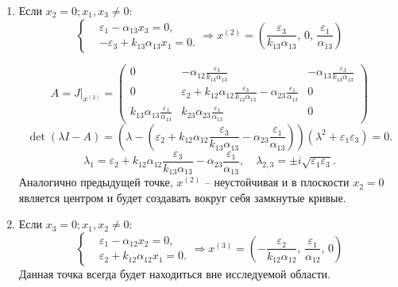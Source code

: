 \begin{enumerate}
        \item Если \( x_2 = 0; x_1, x_3 \neq 0 \):
            \[
                \left\{\begin{split}
                    & \varepsilon_1 - \alpha_{13} x_3 = 0, \\
                    & -\varepsilon_3 + k_{13} \alpha_{13} x_1 = 0. 
                \end{split}\right.
                \Rightarrow
                x^{(2)} = \left( \frac{\varepsilon_3}{k_{13} \alpha_{13}},\, 0,\, \frac{\varepsilon_1}{\alpha_{13}} \right)
            \]

            \[
                A = J \big|_{x^{(2)}} = \left(\begin{matrix}
                    0 & -\alpha_{12} \frac{\varepsilon_3}{k_{13} \alpha_{13}} & -\alpha_{13} \frac{\varepsilon_3}{k_{13} \alpha_{13}} \\[10pt]
                    0 & \varepsilon_2 + k_{12} \alpha_{12} \frac{\varepsilon_3}{k_{13} \alpha_{13}} - \alpha_{23}  \frac{\varepsilon_1}{\alpha_{13}} & 0 \\[10pt]
                    k_{13} \alpha_{13} \frac{\varepsilon_1}{\alpha_{13}} & k_{23} \alpha_{23} \frac{\varepsilon_1}{\alpha_{13}}  & 0
                \end{matrix}\right)
            \]
            \[
                \det(\lambda I - A) = \left(\lambda - \left(\varepsilon_2 + k_{12} \alpha_{12} \frac{\varepsilon_3}{k_{13} \alpha_{13}} - \alpha_{23}  \frac{\varepsilon_1}{\alpha_{13}} \right) \right)(\lambda^2 + \varepsilon_1 \varepsilon_3) = 0.
            \]
            \[
                \lambda_1 = \varepsilon_2 + k_{12} \alpha_{12} \frac{\varepsilon_3}{k_{13} \alpha_{13}} - \alpha_{23}  \frac{\varepsilon_1}{\alpha_{13}}, \quad \lambda_{2,3} = \pm i \sqrt{\varepsilon_1 \varepsilon_3}.
            \]
            Аналогично предыдущей точке, \( x^{(2)} \) -- неустойчивая и в плоскости \( x_2 = 0 \) является центром и будет создавать вокруг себя замкнутые кривые.

        \item Если \( x_3 = 0; x_1, x_2 \neq 0 \):
            \[
                \left\{\begin{split}
                    & \varepsilon_1 - \alpha_{12} x_2 = 0, \\
                    & \varepsilon_2 + k_{12} \alpha_{12} x_1 = 0. 
                \end{split}\right.
                \Rightarrow
                x^{(3)} = \left( -\frac{\varepsilon_2}{k_{12} \alpha_{12}},\, \frac{\varepsilon_1}{\alpha_{12}},\, 0 \right)
            \]
            Данная точка всегда будет находиться вне исследуемой области.


\end{enumerate}
